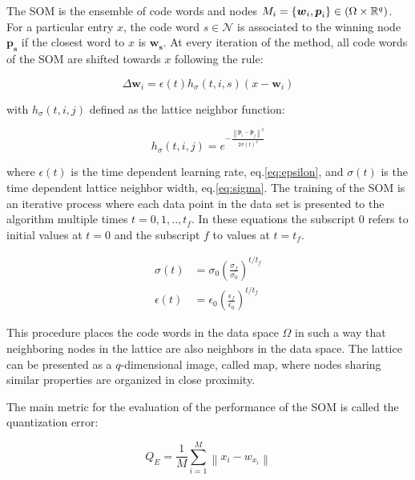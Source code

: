 The SOM is the ensemble of code words and nodes $M_i = \{ \boldsymbol{w}_i, \boldsymbol{p}_i\} \in (\Omega \times \Bbb R^q)$. For a particular entry $x$, the code word $s \in \mathcal{N}$ is associated to the winning node $\boldsymbol{p_s}$ if the closest word to $x$ is $\boldsymbol{w_s}$. At every iteration of the method, all code words of the SOM are shifted towards $x$ following the rule:

\begin{equation}
\Delta \boldsymbol{w}_i = \epsilon(t)h_\sigma(t,i,s)(x-\boldsymbol{w}_i) \label{eq:learnsom}
\end{equation}

with $h_\sigma(t,i,j)$ defined as the lattice neighbor function:

\begin{equation}
h_\sigma(t,i,j) = e^{-\frac{\left\lVert \boldsymbol{p}_i - \boldsymbol{p}_j \right\rVert^2}{2\sigma(t)^2}} \label{eq:neigsom}
\end{equation}

where $\epsilon(t)$ is the time dependent learning rate, eq.\eqref{eq:epsilon}, and $\sigma(t)$ is the time dependent lattice neighbor width, eq.\eqref{eq:sigma}. The training of the SOM is an iterative process where each data point in the data set is presented to the algorithm multiple times $t={0, 1,..,t_f}$. In these equations the subscript $0$ refers to initial values at $t=0$ and the subscript $f$ to values at $t=t_f$.

\begin{align}
\sigma(t) & = \sigma_0 \left(\frac{\sigma_f}{\sigma_0}\right)^{t/t_f} \label{eq:sigma} \\
\epsilon(t) & = \epsilon_0 \left(\frac{\epsilon_f}{\epsilon_0}\right)^{t/t_f} \label{eq:epsilon}
\end{align}

This procedure places the code words in the data space $\Omega$ in such a way that neighboring nodes in the lattice are also neighbors in the data space. The lattice can be presented as a $q$-dimensional image, called map, where nodes sharing similar properties are organized in close proximity.

The main metric for the evaluation of the performance of the SOM is called the quantization error:

\begin{equation}
Q_E = \frac{1}{M} \sum_{i=1}^M \left\lVert x_i - w_{x_i} \right\rVert
\end{equation}

